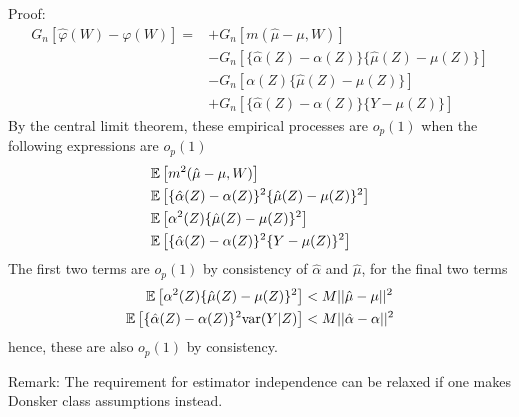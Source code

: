 Proof:
\begin{align*}
    G_n[\hat{\varphi}(W) - \varphi(W)]=
    &+ G_n[m(\hat{\mu} - \mu, W)] \\
    &- G_n\left[\{\hat{\alpha}(Z) - \alpha(Z)\}\{\hat{\mu}(Z) - \mu(Z)\}\right] \\
    &- G_n\left[\alpha(Z)\{\hat{\mu}(Z) - \mu(Z)\}\right] \\
    &+ G_n\left[\{\hat{\alpha}(Z) - \alpha(Z)\}\{Y - \mu(Z)\}\right] 
\end{align*}
By the central limit theorem, these empirical processes are $o_p(1)$ when the following expressions are $o_p(1)$
\begin{align*}
    &\mathbb{E}\left[m^2(\hat{\mu} - \mu, W)\right]\\
    &\mathbb{E}\left[\{\hat{\alpha}(Z) - \alpha(Z)\}^2\{\hat{\mu}(Z) - \mu(Z)\}^2\right] \\
    &\mathbb{E}\left[\alpha^2(Z)\{\hat{\mu}(Z) - \mu(Z)\}^2\right]\\
    &\mathbb{E}\left[\{\hat{\alpha}(Z) - \alpha(Z)\}^2\{Y - \mu(Z)\}^2\right]
\end{align*}
The first two terms are $o_p(1)$ by consistency of $\hat{\alpha}$ and $\hat{\mu}$, for the final two terms
\begin{align*}
    \mathbb{E}\left[\alpha^2(Z)\{\hat{\mu}(Z) - \mu(Z)\}^2\right] &< M ||\hat{\mu} - \mu||^2 \\
    \mathbb{E}\left[\{\hat{\alpha}(Z) - \alpha(Z)\}^2\mathrm{var}(Y|Z)\right] &< M ||\hat{\alpha} - \alpha||^2
\end{align*}
hence, these are also $o_p(1)$ by consistency.

Remark: The requirement for estimator independence can be relaxed if one makes Donsker class assumptions instead.

